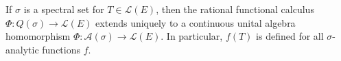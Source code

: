 If $\sigma$ is a spectral set for $T \in \mathcal{L}(E)$, then the rational functional calculus $\Phi: Q(\sigma) \to \mathcal{L}(E)$ extends uniquely to a continuous unital algebra homomorphism $\Phi: \mathcal{A}(\sigma) \to \mathcal{L}(E)$. In particular, $f(T)$ is defined for all $\sigma$-analytic functions $f$.
